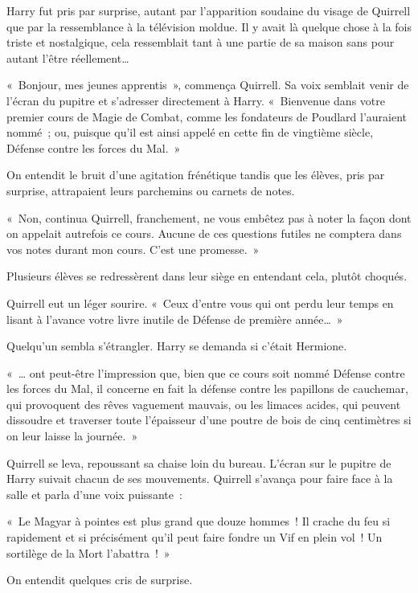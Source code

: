 Harry fut pris par surprise, autant par l'apparition soudaine du visage de Quirrell que par la ressemblance à la télévision moldue.
Il y avait là quelque chose à la fois triste et nostalgique, cela ressemblait tant à une partie de sa maison sans pour autant l'être réellement…

«~Bonjour, mes jeunes apprentis~», commença Quirrell.
Sa voix semblait venir de l'écran du pupitre et s'adresser directement à Harry.
«~Bienvenue dans votre premier cours de Magie de Combat, comme les fondateurs de Poudlard l'auraient nommé~; ou, puisque qu'il est ainsi appelé en cette fin de vingtième siècle, Défense contre les forces du Mal.~»

On entendit le bruit d'une agitation frénétique tandis que les élèves, pris par surprise, attrapaient leurs parchemins ou carnets de notes.

«~Non, continua Quirrell, franchement, ne vous embêtez pas à noter la façon dont on appelait autrefois ce cours.
Aucune de ces questions futiles ne comptera dans vos notes durant mon cours. C'est une promesse.~»

Plusieurs élèves se redressèrent dans leur siège en entendant cela, plutôt choqués.

Quirrell eut un léger sourire.
«~Ceux d'entre vous qui ont perdu leur temps en lisant à l'avance votre livre inutile de Défense de première année…~»

Quelqu'un sembla s'étrangler. Harry se demanda si c'était Hermione.

«~… ont peut-être l'impression que, bien que ce cours soit nommé Défense contre les forces du Mal, il concerne en fait la défense contre les papillons de cauchemar, qui provoquent des rêves vaguement mauvais, ou les limaces acides, qui peuvent dissoudre et traverser toute l'épaisseur d'une poutre de bois de cinq centimètres si on leur laisse la journée.~»

Quirrell se leva, repoussant sa chaise loin du bureau.
L'écran sur le pupitre de Harry suivait chacun de ses mouvements.
Quirrell s'avança pour faire face à la salle et parla d'une voix puissante~:

«~Le Magyar à pointes est plus grand que douze hommes~!
Il crache du feu si rapidement et si précisément qu'il peut faire fondre un Vif en plein vol~!
Un sortilège de la Mort l'abattra~!~»

On entendit quelques cris de surprise.

